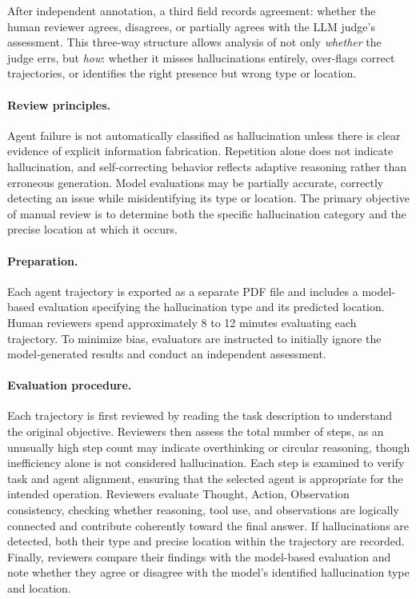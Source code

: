 \documentclass{article}
\begin{document}
After independent annotation, a third field records agreement: whether the human reviewer agrees, disagrees, or partially agrees with the LLM judge's assessment. This three-way structure allows analysis of not only \emph{whether} the judge errs, but \emph{how}: whether it misses hallucinations entirely, over-flags correct trajectories, or identifies the right presence but wrong type or location.

\paragraph{Review principles.}
Agent failure is not automatically classified as hallucination unless there is clear evidence of explicit information fabrication. Repetition alone does not indicate hallucination, and self-correcting behavior reflects adaptive reasoning rather than erroneous generation. Model evaluations may be partially accurate, correctly detecting an issue while misidentifying its type or location. The primary objective of manual review is to determine both the specific hallucination category and the precise location at which it occurs.

\paragraph{Preparation.}
Each agent trajectory is exported as a separate PDF file and includes a model-based evaluation specifying the hallucination type and its predicted location. Human reviewers spend approximately 8 to 12 minutes evaluating each trajectory. To minimize bias, evaluators are instructed to initially ignore the model-generated results and conduct an independent assessment.

\paragraph{Evaluation procedure.}
Each trajectory is first reviewed by reading the task description to understand the original objective. Reviewers then assess the total number of steps, as an unusually high step count may indicate overthinking or circular reasoning, though inefficiency alone is not considered hallucination. Each step is examined to verify task and agent alignment, ensuring that the selected agent is appropriate for the intended operation. Reviewers evaluate Thought, Action, Observation consistency, checking whether reasoning, tool use, and observations are logically connected and contribute coherently toward the final answer. If hallucinations are detected, both their type and precise location within the trajectory are recorded. Finally, reviewers compare their findings with the model-based evaluation and note whether they agree or disagree with the model's identified hallucination type and location.
\end{document}
